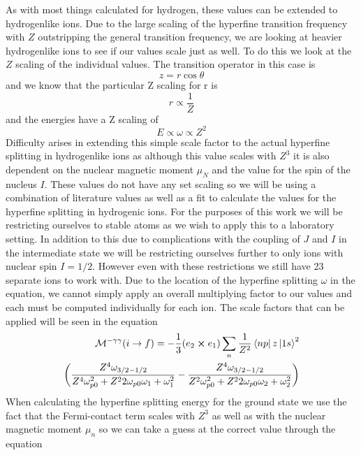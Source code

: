 As with most things calculated for hydrogen, these values can be extended to hydrogenlike ions. Due to the large scaling of the hyperfine transition frequency with $Z$ outstripping the general transition frequency, we are looking at heavier hydrogenlike ions to see if our values scale just as well.  To do this we look at the $Z$ scaling of the individual values. The transition operator in this case is
\begin{equation}
    z=r\cos{\theta}
\end{equation}
and we know that the particular Z scaling for r is
\begin{equation}
    r \propto \frac{1}{Z}
\end{equation}
and the energies have a Z scaling of
\begin{equation}
    E\propto \omega \propto Z^2
\end{equation}
Difficulty arises in extending this simple scale factor to the actual hyperfine splitting in hydrogenlike ions as although this value scales with $Z^3$ it is also dependent on the nuclear magnetic moment $\mu_N$ and the value for the spin of the nucleus $I$. These values do not have any set scaling so we will be using a combination of literature values as well as a fit to calculate the values for the hyperfine splitting in hydrogenic ions. For the purposes of this work we will be restricting ourselves to stable atoms as we wish to apply this to a laboratory setting. In addition to this due to complications with the coupling of $J$ and $I$ in the intermediate state we will be restricting ourselves further to only ions with nuclear spin $I=1/2$. However even with these restrictions we still have 23 separate ions to work with. Due to the location of the hyperfine splitting $\omega$ in the equation, we cannot simply apply an overall multiplying factor to our values and each must be computed individually for each ion. The scale factors that can be applied will be seen in the equation
\begin{equation}
\begin{split}
\mathcal{M}^{-\gamma\gamma}(i\rightarrow f)=
    -\frac{1}{3}(e_2\cross e_1)
    \sum_{n}\frac{1}{Z^2}\bra{np}z\ket{1s}^2\\
    \bigg(
    \frac{Z^4 \omega_{3/2-1/2}}{Z^4 \omega_{p0}^2+Z^2 2\omega_{p0}\omega_1+\omega_1^2}
    -\frac{Z^4 \omega_{3/2-1/2}}{Z^2 \omega_{p0}^2+Z^2 2\omega_{p0}\omega_2+\omega_2^2}
    \bigg)
    \end{split}
\end{equation}
When calculating the hyperfine splitting energy for the ground state we use the fact that the Fermi-contact term scales with $Z^3$ as well as with the nuclear magnetic moment $\mu_n$ so we can take a guess at the correct value through the equation
